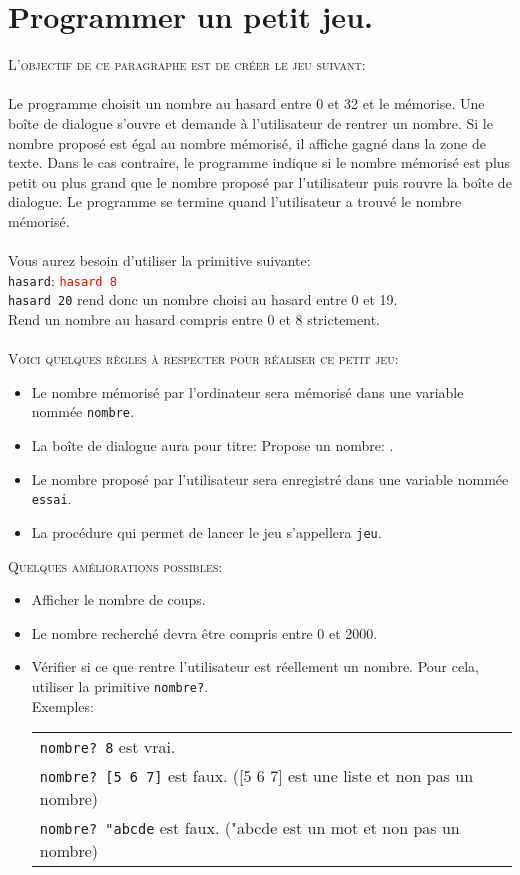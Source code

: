 \section{Programmer un petit jeu.}
\noindent \textsc{L'objectif de ce paragraphe est de créer le jeu suivant:}\\ \\
Le programme choisit un nombre au hasard entre 0 et 32 et le mémorise. Une boîte de dialogue s'ouvre et demande à l'utilisateur de rentrer un nombre. Si le nombre proposé est égal au nombre mémorisé, il affiche \og gagné \fg dans la zone de texte. Dans le cas contraire, le programme indique si le nombre mémorisé est plus petit ou plus grand que le nombre proposé par l'utilisateur puis rouvre la boîte de dialogue. Le programme se termine quand l'utilisateur a trouvé le nombre mémorisé.\\ \\
Vous aurez besoin d'utiliser la primitive suivante:\\
\texttt{hasard}: \hspace{4cm} \textcolor{red}{\texttt{hasard 8}} \\
\texttt{hasard 20} rend donc un nombre choisi au hasard entre 0 et 19.\\
Rend un nombre au hasard compris entre 0 et 8 strictement.\\ \\
\textsc{Voici quelques règles à respecter pour réaliser ce petit jeu:}
\begin{itemize}
\item Le nombre mémorisé par l'ordinateur sera mémorisé dans une variable nommée \texttt{nombre}.
\item La boîte de dialogue aura pour titre: \og Propose un nombre: \fg.
\item Le nombre proposé par l'utilisateur sera enregistré dans une variable nommée \texttt{essai}.
\item La procédure qui permet de lancer le jeu s'appellera  \texttt{jeu}.
\end{itemize}
\vspace{0.5cm}
\noindent \textsc{Quelques améliorations possibles:} \\
\begin{itemize}
\item Afficher le nombre de coups.
\item Le nombre recherché devra être compris entre 0 et 2000.
\item Vérifier si ce que rentre l'utilisateur est réellement un nombre. Pour cela, utiliser la primitive \texttt{nombre?}. \\
Exemples: \begin{tabular}[t]{l}
\texttt{nombre? 8} est vrai.\\
\texttt{nombre? [5 6 7]} est faux. ([5 6 7] est une liste et non pas un nombre)\\
\texttt{nombre? "abcde} est faux. ("abcde est un mot et non pas un nombre)
\end{tabular}
\end{itemize}